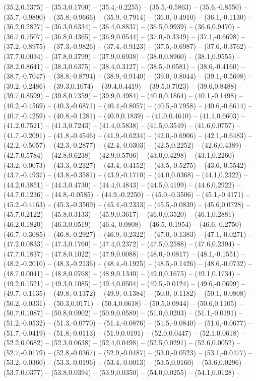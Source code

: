 \documentclass{SVnote}
\begin{document}
(35.2,0.5375) -- (35.3,0.1700) -- (35.4,-0.2255) -- (35.5,-0.5863) -- (35.6,-0.8550) -- (35.7,-0.9890) -- (35.8,-0.9666) -- (35.9,-0.7914) -- (36.0,-0.4910) -- (36.1,-0.1130) -- (36.2,0.2827) -- (36.3,0.6334) -- (36.4,0.8837) -- (36.5,0.9939) -- (36.6,0.9470) -- (36.7,0.7507) -- (36.8,0.4365) -- (36.9,0.0544) -- (37.0,-0.3349) -- (37.1,-0.6698) -- (37.2,-0.8975) -- (37.3,-0.9826) -- (37.4,-0.9123) -- (37.5,-0.6987) -- (37.6,-0.3762) -- (37.7,0.0034) -- (37.8,0.3799) -- (37.9,0.6938) -- (38.0,0.8960) -- (38.1,0.9555) -- (38.2,0.8641) -- (38.3,0.6375) -- (38.4,0.3127) -- (38.5,-0.0581) -- (38.6,-0.4160) -- (38.7,-0.7047) -- (38.8,-0.8794) -- (38.9,-0.9140) -- (39.0,-0.8044) -- (39.1,-0.5698) -- (39.2,-0.2486) -- (39.3,0.1074) -- (39.4,0.4419) -- (39.5,0.7023) -- (39.6,0.8488) -- (39.7,0.8599) -- (39.8,0.7359) -- (39.9,0.4984) -- (40.0,0.1864) -- (40.1,-0.1498) -- (40.2,-0.4569) -- (40.3,-0.6871) -- (40.4,-0.8057) -- (40.5,-0.7958) -- (40.6,-0.6614) -- (40.7,-0.4259) -- (40.8,-0.1281) -- (40.9,0.1839) -- (41.0,0.4610) -- (41.1,0.6603) -- (41.2,0.7521) -- (41.3,0.7243) -- (41.4,0.5838) -- (41.5,0.3549) -- (41.6,0.0757) -- (41.7,-0.2091) -- (41.8,-0.4546) -- (41.9,-0.6234) -- (42.0,-0.6906) -- (42.1,-0.6483) -- (42.2,-0.5057) -- (42.3,-0.2877) -- (42.4,-0.0303) -- (42.5,0.2252) -- (42.6,0.4389) -- (42.7,0.5784) -- (42.8,0.6238) -- (42.9,0.5706) -- (43.0,0.4298) -- (43.1,0.2260) -- (43.2,-0.0073) -- (43.3,-0.2327) -- (43.4,-0.4152) -- (43.5,-0.5275) -- (43.6,-0.5542) -- (43.7,-0.4937) -- (43.8,-0.3581) -- (43.9,-0.1710) -- (44.0,0.0368) -- (44.1,0.2322) -- (44.2,0.3851) -- (44.3,0.4730) -- (44.4,0.4843) -- (44.5,0.4199) -- (44.6,0.2922) -- (44.7,0.1236) -- (44.8,-0.0585) -- (44.9,-0.2250) -- (45.0,-0.3506) -- (45.1,-0.4171) -- (45.2,-0.4163) -- (45.3,-0.3509) -- (45.4,-0.2333) -- (45.5,-0.0839) -- (45.6,0.0728) -- (45.7,0.2122) -- (45.8,0.3133) -- (45.9,0.3617) -- (46.0,0.3520) -- (46.1,0.2881) -- (46.2,0.1820) -- (46.3,0.0519) -- (46.4,-0.0808) -- (46.5,-0.1954) -- (46.6,-0.2750) -- (46.7,-0.3085) -- (46.8,-0.2927) -- (46.9,-0.2322) -- (47.0,-0.1383) -- (47.1,-0.0271) -- (47.2,0.0833) -- (47.3,0.1760) -- (47.4,0.2372) -- (47.5,0.2588) -- (47.6,0.2394) -- (47.7,0.1837) -- (47.8,0.1022) -- (47.9,0.0088) -- (48.0,-0.0817) -- (48.1,-0.1551) -- (48.2,-0.2010) -- (48.3,-0.2136) -- (48.4,-0.1925) -- (48.5,-0.1426) -- (48.6,-0.0732) -- (48.7,0.0041) -- (48.8,0.0768) -- (48.9,0.1340) -- (49.0,0.1675) -- (49.1,0.1734) -- (49.2,0.1521) -- (49.3,0.1085) -- (49.4,0.0504) -- (49.5,-0.0124) -- (49.6,-0.0699) -- (49.7,-0.1135) -- (49.8,-0.1372) -- (49.9,-0.1384) -- (50.0,-0.1182) -- (50.1,-0.0808) -- (50.2,-0.0331) -- (50.3,0.0171) -- (50.4,0.0618) -- (50.5,0.0944) -- (50.6,0.1105) -- (50.7,0.1087) -- (50.8,0.0902) -- (50.9,0.0589) -- (51.0,0.0203) -- (51.1,-0.0191) -- (51.2,-0.0532) -- (51.3,-0.0770) -- (51.4,-0.0876) -- (51.5,-0.0840) -- (51.6,-0.0677) -- (51.7,-0.0419) -- (51.8,-0.0113) -- (51.9,0.0191) -- (52.0,0.0447) -- (52.1,0.0618) -- (52.2,0.0682) -- (52.3,0.0638) -- (52.4,0.0498) -- (52.5,0.0291) -- (52.6,0.0052) -- (52.7,-0.0179) -- (52.8,-0.0367) -- (52.9,-0.0487) -- (53.0,-0.0523) -- (53.1,-0.0477) -- (53.2,-0.0360) -- (53.3,-0.0196) -- (53.4,-0.0013) -- (53.5,0.0160) -- (53.6,0.0296) -- (53.7,0.0377) -- (53.8,0.0394) -- (53.9,0.0350) -- (54.0,0.0255) -- (54.1,0.0128) -- 
\end{document}
